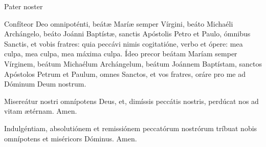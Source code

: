 \documentclass[a4paper, twoside, 12pt]{article}
\begin{document}
\vfill

\noindent Pater noster 

\vfill
\pagebreak


\noindent Confíteor Deo omnipoténti, beátæ Maríæ semper Vírgini, beáto
Michaéli Archángelo, beáto Joánni Baptístæ, sanctis Apóstolis Petro
et Paulo, ómnibus Sanctis, et vobis fratres: quia peccávi nimis cogitatióne,
verbo et ópere: mea culpa, mea culpa, mea máxima culpa.
Ídeo precor beátam Maríam semper Vírginem, beátum Michaélum
Archángelum, beátum Joánnem Baptístam, sanctos Apóstolos Petrum
et Paulum, omnes Sanctos, et vos fratres, oráre pro me ad Dóminum
Deum nostrum.

\vfill

\noindent \Vbardot{} Misereátur nostri omnípotens Deus, et, dimíssis peccátis nostris, perdúcat
nos ad vitam ætérnam. \Rbardot{} Amen.

\vfill

\noindent \Vbardot{} Indulgéntiam, absolutiónem et remissiónem peccatórum nostrórum tríbuat nobis
omnípotens et miséricors Dóminus. \Rbardot{} Amen.

\vfill



\vfill


\vfill
\pagebreak






\vfill
\pagebreak

 


\pagebreak

 


\vfill

\end{document}
